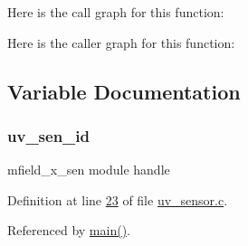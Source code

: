 Here is the call graph for this function\+:




Here is the caller graph for this function\+:




\subsection{Variable Documentation}
\hypertarget{a00020_afd789f3f9ea182d28d4f16db0d8d5652}{
\subsubsection[{uv\+\_\+sen\+\_\+id}]{ uv\+\_\+sen\+\_\+id}}\label{a00020_afd789f3f9ea182d28d4f16db0d8d5652}


mfield\+\_\+x\+\_\+sen module handle 



Definition at line \hyperlink{a00073_source_l00023}{23} of file \hyperlink{a00073_source}{uv\+\_\+sensor.\+c}.



Referenced by \hyperlink{a00048_source_l00080}{main()}.

